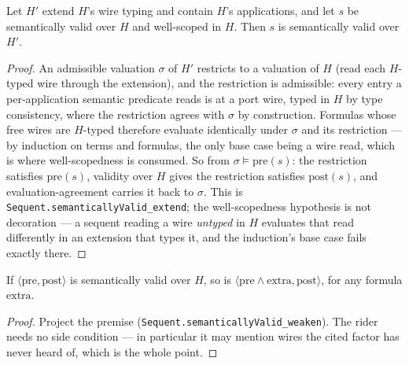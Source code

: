 \begin{blemma}\label{lem:pl-transport}
Let $H'$ extend $H$'s wire typing and contain $H$'s applications, and
let $s$ be semantically valid over $H$ and well-scoped in $H$. Then
$s$ is semantically valid over $H'$.
\end{blemma}
\begin{proof}
An admissible valuation $\sigma$ of $H'$ restricts to a valuation of
$H$ (read each $H$-typed wire through the extension), and the
restriction is admissible: every entry a per-application semantic
predicate reads is at a port wire, typed in $H$ by type consistency,
where the restriction agrees with $\sigma$ by construction. Formulas
whose free wires are $H$-typed therefore evaluate identically under
$\sigma$ and its restriction --- by induction on terms and formulas,
the only base case being a wire read, which is where well-scopedness
is consumed. So from $\sigma \models \mathrm{pre}(s)$: the restriction
satisfies $\mathrm{pre}(s)$, validity over $H$ gives the restriction
satisfies $\mathrm{post}(s)$, and evaluation-agreement carries it back
to $\sigma$. This is \texttt{Sequent.semanticallyValid\_extend};
the well-scopedness hypothesis is not decoration --- a sequent reading
a wire \emph{untyped} in $H$ evaluates that read differently in an
extension that types it, and the induction's base case fails exactly
there.
\end{proof}

\begin{blemma}\label{lem:pl-weaken}
If $\langle \mathrm{pre}, \mathrm{post} \rangle$ is semantically valid
over $H$, so is
$\langle \mathrm{pre} \wedge \mathrm{extra}, \mathrm{post} \rangle$,
for any formula $\mathrm{extra}$.
\end{blemma}
\begin{proof}
Project the premise (\texttt{Sequent.semanticallyValid\_weaken}). The
rider needs no side condition --- in particular it may mention wires
the cited factor has never heard of, which is the whole point.
\end{proof}


